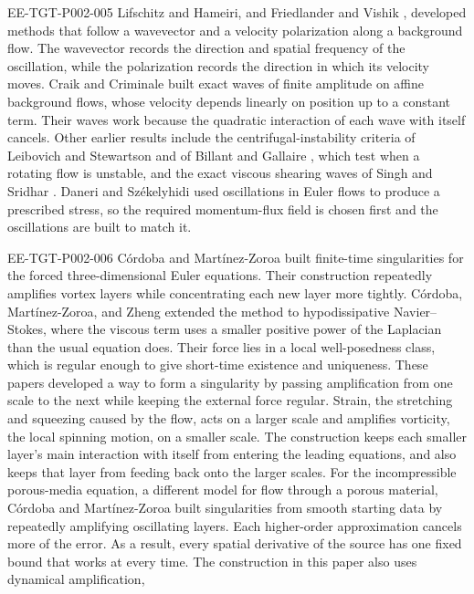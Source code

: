 \begin{EESegment}{EE-TGT-P002-005}
Lifschitz and Hameiri, and Friedlander and Vishik \cite{ref-17,ref-14}, developed methods that
follow a wavevector and a velocity polarization along a background flow. The wavevector records
the direction and spatial frequency of the oscillation, while the polarization records the
direction in which its velocity moves. Craik and Criminale \cite{ref-9} built exact waves of
finite amplitude on affine background flows, whose velocity depends linearly on position up to
a constant term. Their waves work because the quadratic interaction of each wave with itself
cancels. Other earlier results include the centrifugal-instability criteria of Leibovich and
Stewartson \cite{ref-15} and of Billant and Gallaire \cite{ref-2,ref-3}, which test when a rotating
flow is unstable, and the exact viscous shearing waves of Singh and Sridhar \cite{ref-19}.
Daneri and Székelyhidi \cite{ref-10} used oscillations in Euler flows to produce a prescribed
stress, so the required momentum-flux field is chosen first and the oscillations are built to
match it.
\end{EESegment}

\begin{EESegment}{EE-TGT-P002-006}
Córdoba and Martínez-Zoroa \cite{ref-6} built finite-time singularities for the forced
three-dimensional Euler equations. Their construction repeatedly amplifies vortex layers while
concentrating each new layer more tightly. Córdoba, Martínez-Zoroa, and Zheng \cite{ref-8}
extended the method to hypodissipative Navier--Stokes, where the viscous term uses a smaller
positive power of the Laplacian than the usual equation does. Their force lies in a local well-posedness class,
which is regular enough to give short-time existence and uniqueness. These papers developed a
way to form a singularity by passing amplification from one scale to the next while keeping the
external force regular. Strain, the stretching and squeezing caused by the flow, acts on a larger
scale and amplifies vorticity, the local spinning motion, on a smaller scale. The construction
keeps each smaller layer's main interaction with itself from entering the leading equations, and
also keeps that layer from feeding back onto the larger scales. For the incompressible porous-media equation, a different model for flow through a
porous material, Córdoba and Martínez-Zoroa \cite{ref-7} built singularities from smooth starting
data by repeatedly amplifying oscillating layers. Each higher-order approximation cancels more
of the error. As a result, every spatial derivative of the source has one fixed bound that works
at every time. The construction in this paper also uses dynamical amplification,
\end{EESegment}

